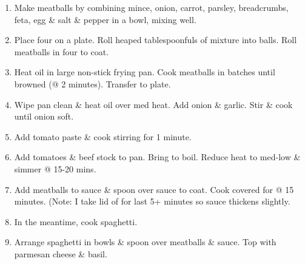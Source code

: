 \documentclass[11pt,a4paper]{article}
\begin{document}
\begin{enumerate}
  \item Make meatballs by combining mince, onion, carrot, parsley, breadcrumbs,
    feta, egg {\&} salt {\&} pepper in a bowl, mixing well.

  \item Place four on a plate. Roll heaped tablespoonfuls of mixture into balls.
    Roll meatballs in four to coat.

  \item Heat oil in large non-stick frying pan. Cook meatballs in batches until
    browned (@ 2 minutes). Transfer to plate.

  \item Wipe pan clean {\&} heat oil over med heat. Add onion {\&} garlic. Stir
    {\&} cook until onion soft.

  \item Add tomato paste {\&} cook stirring for 1 minute.

  \item Add tomatoes {\&} beef stock to pan. Bring to boil. Reduce heat to
    med-low {\&} simmer @ 15-20 mins.

  \item Add meatballs to sauce {\&} spoon over sauce to coat. Cook covered for @
    15 minutes. (Note: I take lid of for last 5+ minutes so sauce thickens
    slightly.

  \item In the meantime, cook spaghetti.

  \item Arrange spaghetti in bowls {\&} spoon over meatballs {\&} sauce. Top
    with parmesan cheese {\&} basil.

\end{enumerate}
\end{document}
